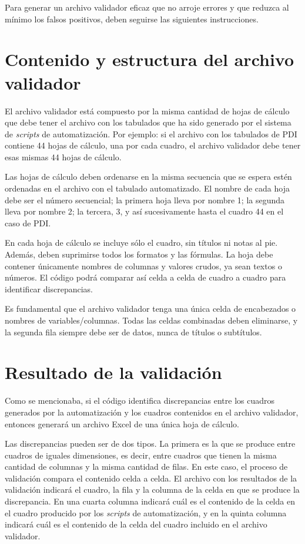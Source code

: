 \documentclass[
  spanish,
]{book}
\begin{document}
Para generar un archivo validador eficaz que no arroje errores y que reduzca al mínimo los falsos positivos, deben seguirse las siguientes instrucciones.

\hypertarget{contenido-y-estructura-del-archivo-validador}{%
\section{Contenido y estructura del archivo validador}\label{contenido-y-estructura-del-archivo-validador}}

El archivo validador está compuesto por la misma cantidad de hojas de cálculo que debe tener el archivo con los tabulados que ha sido generado por el sistema de \emph{scripts} de automatización. Por ejemplo: si el archivo con los tabulados de PDI contiene 44 hojas de cálculo, una por cada cuadro, el archivo validador debe tener esas mismas 44 hojas de cálculo.

Las hojas de cálculo deben ordenarse en la misma secuencia que se espera estén ordenadas en el archivo con el tabulado automatizado. El nombre de cada hoja debe ser el número secuencial; la primera hoja lleva por nombre 1; la segunda lleva por nombre 2; la tercera, 3, y así sucesivamente hasta el cuadro 44 en el caso de PDI.

En cada hoja de cálculo se incluye sólo el cuadro, sin títulos ni notas al pie. Además, deben suprimirse todos los formatos y las fórmulas. La hoja debe contener únicamente nombres de columnas y valores crudos, ya sean textos o números. El código podrá comparar así celda a celda de cuadro a cuadro para identificar discrepancias.

Es fundamental que el archivo validador tenga una única celda de encabezados o nombres de variables/columnas. Todas las celdas combinadas deben eliminarse, y la segunda fila siempre debe ser de datos, nunca de títulos o subtítulos.

\hypertarget{resultado-de-la-validaciuxf3n}{%
\section{Resultado de la validación}\label{resultado-de-la-validaciuxf3n}}

Como se mencionaba, si el código identifica discrepancias entre los cuadros generados por la automatización y los cuadros contenidos en el archivo validador, entonces generará un archivo Excel de una única hoja de cálculo.

Las discrepancias pueden ser de dos tipos. La primera es la que se produce entre cuadros de iguales dimensiones, es decir, entre cuadros que tienen la misma cantidad de columnas y la misma cantidad de filas. En este caso, el proceso de validación compara el contenido celda a celda. El archivo con los resultados de la validación indicará el cuadro, la fila y la columna de la celda en que se produce la discrepancia. En una cuarta columna indicará cuál es el contenido de la celda en el cuadro producido por los \emph{scripts} de automatización, y en la quinta columna indicará cuál es el contenido de la celda del cuadro incluido en el archivo validador.
\end{document}
